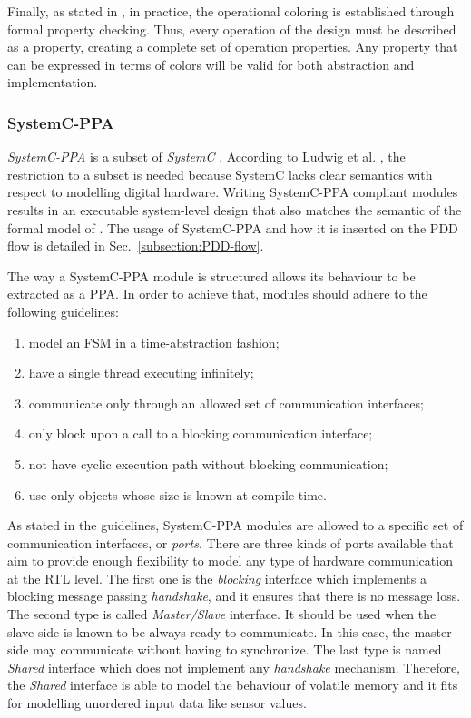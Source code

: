 Finally, as stated in \cite{paper-pdd}, in practice, the operational coloring is established through formal property checking. Thus, every operation of the design must be described as a property, creating a complete set of operation properties. Any property that can be expressed in terms of colors will be valid for both abstraction and implementation.

\subsubsection*{SystemC-PPA}

\textit{SystemC-PPA} is a subset of \textit{SystemC} \cite{lib-systemc}. According to Ludwig et al. \cite{paper-pdd}, the restriction to a subset is needed because SystemC lacks clear semantics with respect to modelling digital hardware. Writing SystemC-PPA compliant modules results in an executable system-level design that also matches the semantic of the formal model of \cite{paper-pdd}. The usage of SystemC-PPA and how it is inserted on the PDD flow is detailed in Sec.~\ref{subsection:PDD-flow}.

The way a SystemC-PPA module is structured allows its behaviour to be extracted as a PPA. In order to achieve that, modules should adhere to the following guidelines:

\begin{enumerate}
    \item model an FSM in a time-abstraction fashion;
    \item have a single thread executing infinitely;
    \item communicate only through an allowed set of communication interfaces;
    \item only block upon a call to a blocking communication interface;
    \item not have cyclic execution path without blocking communication;
    \item use only objects whose size is known at compile time.
\end{enumerate}

As stated in the guidelines, SystemC-PPA modules are allowed to a specific set of communication interfaces, or \textit{ports}. There are three kinds of ports available that aim to provide enough flexibility to model any type of hardware communication at the RTL level. The first one is the \textit{blocking} interface which implements a blocking message passing \textit{handshake}, and it ensures that there is no message loss. The second type is called \textit{Master/Slave} interface. It should be used when the slave side is known to be always ready to communicate. In this case, the master side may communicate without having to synchronize. The last type is named \textit{Shared} interface which does not implement any \textit{handshake} mechanism. Therefore, the \textit{Shared} interface is able to model the behaviour of volatile memory and it fits for modelling unordered input data like sensor values. 

